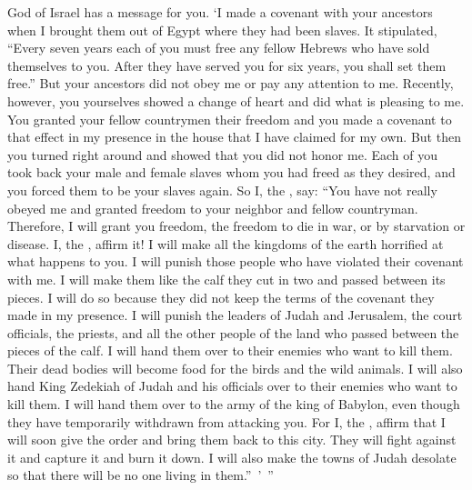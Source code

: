 {{}
God
of Israel
has a message for you. ‘I
made
a covenant
with
your ancestors
when
I brought
them out of Egypt
where they had been slaves. It stipulated,
“Every
seven
years
each
of you must
free
any fellow
Hebrews
who have
sold
themselves to you. After they have served
you for six
years,
you shall set
them free.”
But your ancestors
did not
obey
me or pay
any attention to me.
Recently,
however, you yourselves
showed a change of heart and did
what is pleasing
to me. You granted your
fellow countrymen
their freedom
and you made
a covenant
to that effect in my presence
in the house
that
I have
claimed
for my own.
But then you turned right around
and showed that you did not honor
me.
Each of you
took back
your male
and female
slaves
whom
you had freed
as they desired,
and you forced
them
to be
your slaves again.
So
I,
the {}, say: “You
have not
really obeyed me
and granted freedom
to
your neighbor
and fellow
countryman.
Therefore, I
will grant you freedom,
the freedom
to
die
in war,
or by
starvation
or disease.
I, the
{}, affirm
it! I will make
all
the kingdoms
of the earth
horrified at what happens to you.
I will
punish those people
who have
violated
their covenant
with me. I will make them
like the calf
they cut
in two
and passed
between
its pieces.
I will do so because they did not
keep the
terms
of the covenant
they made in my presence.
I will punish the leaders
of Judah
and Jerusalem,
the court officials,
the priests,
and all
the other people
of the land
who passed
between
the pieces
of the calf.
I will
hand
them over to their enemies
who want
to kill
them. Their dead bodies
will become
food
for the birds
and the wild
animals.
I will
also
hand King
Zedekiah
of Judah
and his officials
over
to their enemies
who want
to kill
them. I will hand
them over to the army
of the king
of Babylon,
even though they have temporarily withdrawn
from attacking you.
For I, the
{}, affirm
that I will soon
give the order
and bring them back
to
this
city.
They will fight
against
it and capture
it and burn
it down.
I will also
make
the towns
of Judah
desolate
so that there will be no
one living in them.” ’ ”

}
